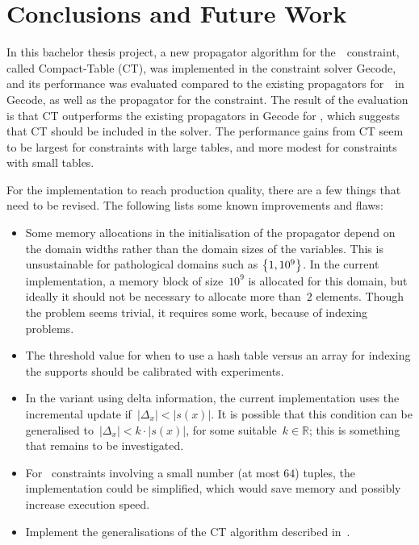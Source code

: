 \documentclass[a4paper,11pt]{article}
\newcommand{\Table}{\Constraint{Table}}
\numberwithin{equation}{section}
\begin{document}
\section{Conclusions and Future Work}
\label{conclusions}

In this bachelor thesis project, a new propagator algorithm for the~\Table~constraint,
called Compact-Table (CT), was implemented in the constraint solver Gecode, and its performance
was evaluated compared to the existing propagators for~\Table~in Gecode, as well
as the propagator for the  constraint.
The result of the evaluation is that CT outperforms the existing propagators
in Gecode for \Table, which suggests that CT should be included in the solver.
The performance gains from CT seem to be largest for constraints with large tables,
and more modest for constraints with small tables.

For the implementation to reach production quality, there
are a few things that need to be revised. The following lists some known
improvements and flaws:

\begin{itemize}
    
  \item Some memory allocations in the initialisation of the propagator
    depend on the domain widths rather
    than the domain sizes of the variables. This is unsustainable
    for pathological domains such as $\left\{1, 10^9\right\}$. In the current
    implementation, a memory block of size~$10^9$ is allocated for this
    domain, but ideally it should not be necessary to allocate more than~$2$
    elements. Though the problem seems trivial, it requires some
    work, because of indexing problems.

  \item The threshold value for when to use a hash table versus
    an array for indexing the supports should be calibrated with
    experiments.

  \item In the variant using delta information, the current implementation
    uses the incremental update if~$|\Delta_x| < |s(x)|$. It is possible
    that this condition can be generalised to~$|\Delta_x| < k \cdot |s(x)|$,
    for some suitable~$k \in \mathbb{R}$; this is something that remains 
    to be investigated.
    
  \item For \Table~constraints involving a small number (at most $64$)
    tuples, the implementation could be simplified, which would save
    memory and possibly increase execution speed.

  \item Implement the generalisations of the CT algorithm described
    in~\cite{DBLP:conf/aaai/VerhaegheLS17}.

\end{itemize}
\end{document}
